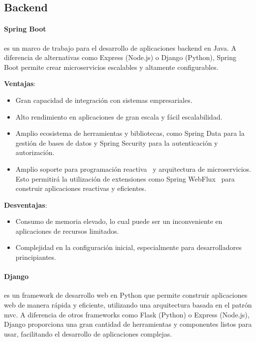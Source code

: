 \subsection{Backend}

\paragraph{Spring Boot~\cite{springboot}} es un marco de trabajo para el desarrollo de aplicaciones \gls{backend} en Java. A diferencia de alternativas como Express (Node.js) o Django (Python), Spring Boot permite crear microservicios escalables y altamente configurables.

\textbf{Ventajas}:
\begin{itemize}
    \item Gran capacidad de integración con sistemas empresariales.
    \item Alto rendimiento en aplicaciones de gran escala y fácil escalabilidad.
    \item Amplio ecosistema de herramientas y bibliotecas, como Spring Data para la gestión de bases de datos y Spring Security para la autenticación y autorización.
    \item Amplio soporte para programación reactiva~\cite{hashemi2025reactive} y arquitectura de microservicios. Esto permitirá la utilización de extensiones como Spring WebFlux~\cite{webflux} para construir aplicaciones reactivas y eficientes.
\end{itemize}

\textbf{Desventajas}:
\begin{itemize}
    \item Consumo de memoria elevado, lo cual puede ser un inconveniente en aplicaciones de recursos limitados.
    \item Complejidad en la configuración inicial, especialmente para desarrolladores principiantes.
\end{itemize}


\paragraph{Django~\cite{django}} es un \gls{framework} de desarrollo web en Python que permite construir aplicaciones web de manera rápida y eficiente, utilizando una arquitectura basada en el patrón \gls{mvc}. A diferencia de otros \glspl{framework} como Flask\cite{flask} (Python) o Express (Node.js), Django proporciona una gran cantidad de herramientas y componentes listos para usar, facilitando el desarrollo de aplicaciones complejas.

